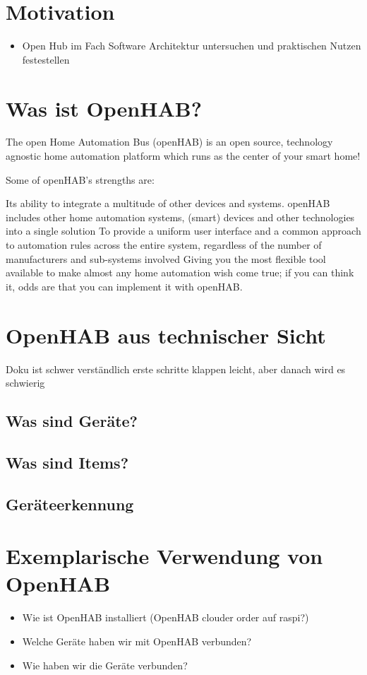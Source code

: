 \section{Motivation}
\begin{itemize}
	\item Open Hub im Fach Software Architektur untersuchen und praktischen Nutzen festestellen
\end{itemize}

\section{Was ist OpenHAB?}
The open Home Automation Bus (openHAB) is an open source, technology agnostic home automation platform which runs as the center of your smart home!

Some of openHAB's strengths are:

Its ability to integrate a multitude of other devices and systems. openHAB includes other home automation systems, (smart) devices and other technologies into a single solution
To provide a uniform user interface and a common approach to automation rules across the entire system, regardless of the number of manufacturers and sub-systems involved
Giving you the most flexible tool available to make almost any home automation wish come true; if you can think it, odds are that you can implement it with openHAB.

\section{OpenHAB aus technischer Sicht}

Doku ist schwer verständlich
erste schritte klappen leicht, aber danach wird es schwierig

\subsection{Was sind Geräte?}

\subsection{Was sind Items?}

\subsection{Geräteerkennung}

\section{Exemplarische Verwendung von OpenHAB}
\begin{itemize}
	\item Wie ist OpenHAB installiert (OpenHAB clouder order auf raspi?)
	\item Welche Geräte haben wir mit OpenHAB verbunden?
	\item Wie haben wir die Geräte verbunden?
	
\end{itemize}


